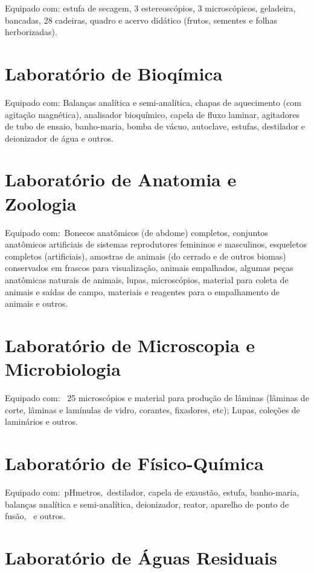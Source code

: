 \documentclass[11pt,fleqn]{book} %
\begin{document}
Equipado com: estufa de secagem, 3 estereoscópios, 3 microscópicos, geladeira, bancadas, 28 cadeiras, quadro e acervo didático (frutos, sementes e folhas herborizadas). 

\section{Laboratório de Bioqímica}

Equipado com: Balanças analítica e semi-analítica, chapas de aquecimento (com agitação magnética), analisador bioquímico, capela de fluxo laminar, agitadores de tubo de ensaio, banho-maria, bomba de vácuo, autoclave, estufas, destilador e deionizador de água e outros.

\section{Laboratório de Anatomia e Zoologia}

Equipado com: Bonecos anatômicos (de abdome) completos, conjuntos anatômicos artificiais de sistemas reprodutores femininos e masculinos, esqueletos completos (artificiais), amostras de animais (do cerrado e de outros biomas) conservados em frascos para visualização, animais empalhados, algumas peças anatômicas naturais de animais, lupas, microscópios, material para coleta de animais e saídas de campo, materiais e reagentes para o empalhamento de animais e outros.

\section{Laboratório de Microscopia e Microbiologia}

Equipado com:  25 microscópios e material para produção de lâminas (lâminas de corte, lâminas e lamínulas de vidro, corantes, fixadores, etc); Lupas, coleções de laminários e outros.

\section{Laboratório de Físico-Química}

Equipado com: pHmetros, destilador, capela de exaustão, estufa, banho-maria, balanças analítica e semi-analítica, deionizador, reator, aparelho de ponto de fusão,  e outros.

\section{Laboratório de Águas Residuais}
\end{document}
